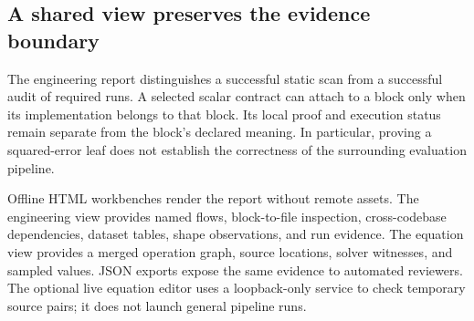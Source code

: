 \subsection{A shared view preserves the evidence boundary}
The engineering report distinguishes a successful static scan from a successful audit of required runs. A selected scalar contract can attach to a block only when its implementation belongs to that block. Its local proof and execution status remain separate from the block's declared meaning. In particular, proving a squared-error leaf does not establish the correctness of the surrounding evaluation pipeline.

Offline HTML workbenches render the report without remote assets. The engineering view provides named flows, block-to-file inspection, cross-codebase dependencies, dataset tables, shape observations, and run evidence. The equation view provides a merged operation graph, source locations, solver witnesses, and sampled values. JSON exports expose the same evidence to automated reviewers. The optional live equation editor uses a loopback-only service to check temporary source pairs; it does not launch general pipeline runs.

